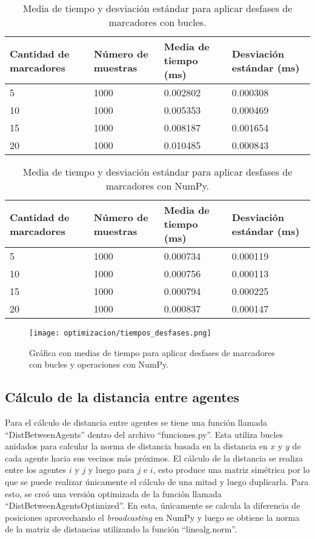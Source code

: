 \begin{table}[H]
	\centering
	\resizebox{\textwidth}{!} {
	\begin{tabular}{|l|l|l|l|}
		\hline
		\textbf{Cantidad de marcadores} & \textbf{Número de muestras} & \textbf{Media de tiempo (ms)} & \textbf{Desviación estándar (ms)} \\ \hline
		5 & 1000 & 0.002802 & 0.000308 \\ \hline
		10 & 1000 & 0.005353 & 0.000469 \\ \hline
		15 & 1000 & 0.008187 & 0.001654 \\ \hline
		20 & 1000 & 0.010485 & 0.000843 \\ \hline
	\end{tabular}}
	\caption{Media de tiempo y desviación estándar para aplicar desfases de marcadores con bucles.}
	\label{cuadro:tiempos_desfases_for}
\end{table}

\begin{table}[H]
	\centering
	\resizebox{\textwidth}{!} {
	\begin{tabular}{|l|l|l|l|}
		\hline
		\textbf{Cantidad de marcadores} & \textbf{Número de muestras} & \textbf{Media de tiempo (ms)} & \textbf{Desviación estándar (ms)} \\ \hline
		5 & 1000 & 0.000734 & 0.000119 \\ \hline
		10 & 1000 & 0.000756 & 0.000113 \\ \hline
		15 & 1000 & 0.000794 & 0.000225 \\ \hline
		20 & 1000 & 0.000837 & 0.000147 \\ \hline
	\end{tabular}}
	\caption{Media de tiempo y desviación estándar para aplicar desfases de marcadores con NumPy.}
	\label{cuadro:tiempos_desfases_numpy}
\end{table}

\begin{figure}[H]
	\centering
	\texttt{[image: optimizacion/tiempos\_desfases.png]}
	\caption{Gráfica con medias de tiempo para aplicar desfases de marcadores con bucles y operaciones con NumPy.}
	\label{fig:grafica_tiempos_desfases}
\end{figure}

\subsection{Cálculo de la distancia entre agentes}
Para el cálculo de distancia entre agentes se tiene una función llamada ``DistBetweenAgents'' dentro del archivo ``funciones.py''. Esta utiliza bucles anidados para calcular la norma de distancia basada en la distancia en $x$ y $y$ de cada agente hacia sus vecinos más próximos. El cálculo de la distancia se realiza entre los agentes $i$ y $j$ y luego para $j$ e $i$, esto produce una matriz simétrica por lo que se puede realizar únicamente el cálculo de una mitad y luego duplicarla. Para esto, se creó una versión optimizada de la función llamada ``DistBetweenAgentsOptimized''. En esta, únicamente se calcula la diferencia de posiciones aprovechando el \textit{broadcasting} en NumPy y luego se obtiene la norma de la matriz de distancias utilizando la función ``linealg.norm''.

